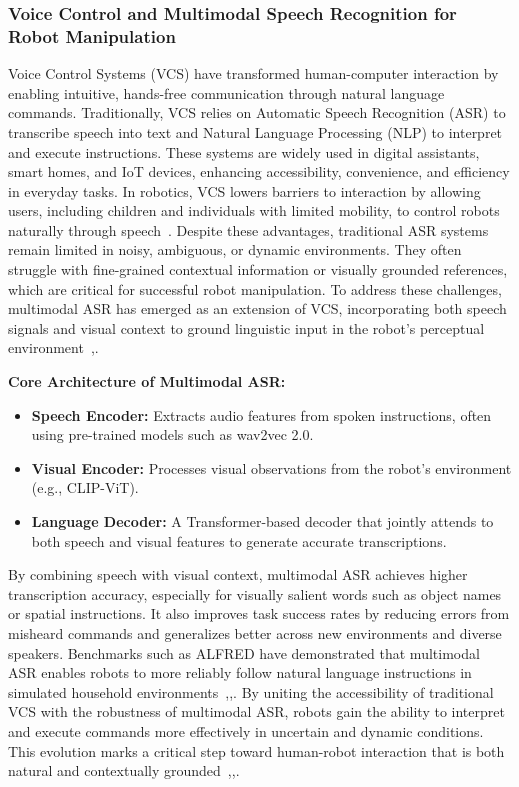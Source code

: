 \documentclass[12pt]{extarticle}
\begin{document}
\subsubsection{Voice Control and Multimodal Speech Recognition for Robot Manipulation}

Voice Control Systems (VCS) have transformed human-computer interaction by enabling intuitive, hands-free communication through natural language commands. Traditionally, VCS relies on Automatic Speech Recognition (ASR) to transcribe speech into text and Natural Language Processing (NLP) to interpret and execute instructions. These systems are widely used in digital assistants, smart homes, and IoT devices, enhancing accessibility, convenience, and efficiency in everyday tasks. In robotics, VCS lowers barriers to interaction by allowing users, including children and individuals with limited mobility, to control robots naturally through speech~\cite{vcs}. Despite these advantages, traditional ASR systems remain limited in noisy, ambiguous, or dynamic environments. They often struggle with fine-grained contextual information or visually grounded references, which are critical for successful robot manipulation. To address these challenges, multimodal ASR has emerged as an extension of VCS, incorporating both speech signals and visual context to ground linguistic input in the robot’s perceptual environment~\cite{Chang2023},\cite{multi}.

\textbf{Core Architecture of Multimodal ASR:}
\begin{itemize}
    \item \textbf{Speech Encoder:} Extracts audio features from spoken instructions, often using pre-trained models such as wav2vec 2.0.
    \item \textbf{Visual Encoder:} Processes visual observations from the robot’s environment (e.g., CLIP-ViT).
    \item \textbf{Language Decoder:} A Transformer-based decoder that jointly attends to both speech and visual features to generate accurate transcriptions.
\end{itemize}

By combining speech with visual context, multimodal ASR achieves higher transcription accuracy, especially for visually salient words such as object names or spatial instructions. It also improves task success rates by reducing errors from misheard commands and generalizes better across new environments and diverse speakers. Benchmarks such as ALFRED have demonstrated that multimodal ASR enables robots to more reliably follow natural language instructions in simulated household environments~\cite{vcs},\cite{Chang2023},\cite{multi}. By uniting the accessibility of traditional VCS with the robustness of multimodal ASR, robots gain the ability to interpret and execute commands more effectively in uncertain and dynamic conditions. This evolution marks a critical step toward human-robot interaction that is both natural and contextually grounded~\cite{vcs},\cite{Chang2023},\cite{multi}.
\end{document}
